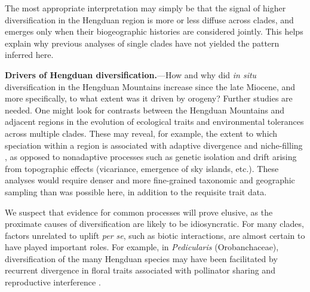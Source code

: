 The most appropriate interpretation may simply be that the signal of higher diversification in the Hengduan region is more or less diffuse across clades, and emerges only when their biogeographic histories are considered jointly. This helps explain why previous analyses of single clades have not yielded the pattern inferred here.

\textbf{Drivers of Hengduan diversification.}---How and why did \textit{in situ} diversification in the Hengduan Mountains increase since the late Miocene, and more specifically, to what extent was it driven by orogeny? Further studies are needed. One might look for contrasts between the Hengduan Mountains and adjacent regions in the evolution of ecological traits and environmental tolerances \citep[e.g.,][]{liu2016} across multiple clades. These may reveal, for example, the extent to which speciation within a region is associated with adaptive divergence and niche-filling \citep{price2014}, as opposed to nonadaptive processes such as genetic isolation and drift arising from topographic effects (vicariance, emergence of sky islands, etc.). These analyses would require denser and more fine-grained taxonomic and geographic sampling than was possible here, in addition to the requisite trait data.


We suspect that evidence for common processes will prove elusive, as the proximate causes of diversification are likely to be idiosyncratic. For many clades, factors unrelated to uplift \emph{per se}, such as biotic interactions, are almost certain to have played important roles. For example, in \emph{Pedicularis} (Orobanchaceae), diversification of the many Hengduan species may have been facilitated by recurrent divergence in floral traits associated with pollinator sharing and reproductive interference \citep[e.g.,][]{eaton2012}.

